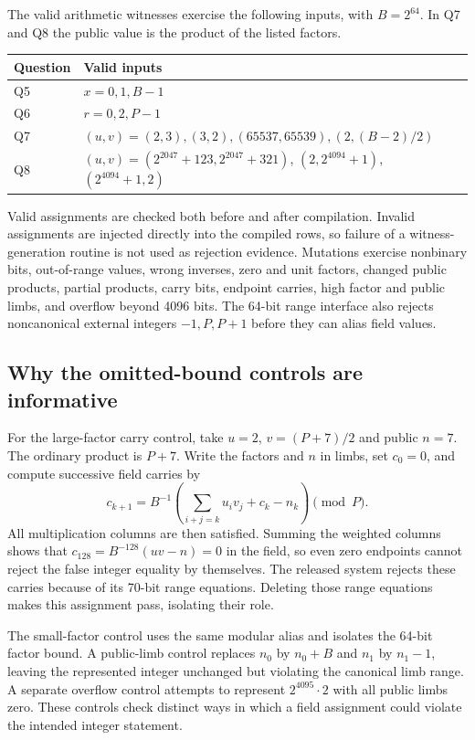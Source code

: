 \documentclass[11pt,a4paper]{article}
\begin{document}
The valid arithmetic witnesses exercise the following inputs, with
$B=2^{64}$. In Q7 and Q8 the public value is the product of the listed factors.
\begin{center}
\begin{tabularx}{\linewidth}{lX}\toprule
Question & Valid inputs\\\midrule
Q5 & $x=0,1,B-1$\\
Q6 & $r=0,2,P-1$\\
Q7 & $(u,v)=(2,3),(3,2),(65537,65539),(2,(B-2)/2)$\\
Q8 & $(u,v)=(2^{2047}+123,2^{2047}+321)$,
$(2,2^{4094}+1)$, $(2^{4094}+1,2)$\\\bottomrule
\end{tabularx}
\end{center} 
Valid assignments are checked both before and after compilation. Invalid
assignments are injected directly into the compiled rows, so failure of a
witness-generation routine is not used as rejection evidence. Mutations
exercise nonbinary bits, out-of-range values, wrong inverses, zero and unit
factors, changed public products, partial products, carry bits, endpoint
carries, high factor and public limbs, and overflow beyond 4096 bits.
The 64-bit range interface also rejects noncanonical external integers
$-1,P,P+1$ before they can alias field values.

\subsection{Why the omitted-bound controls are informative}
For the large-factor carry control, take $u=2$, $v=(P+7)/2$ and public
$n=7$. The ordinary product is $P+7$. Write the factors and $n$ in limbs,
set $c_0=0$, and compute successive field carries by
\[
c_{k+1}=B^{-1}\left(\sum_{i+j=k}u_iv_j+c_k-n_k\right)\pmod P.
\]
All multiplication columns are then satisfied. Summing the weighted columns
shows that $c_{128}=B^{-128}(uv-n)=0$ in the field, so even zero endpoints
cannot reject the false integer equality by themselves. The released system
rejects these carries because of its 70-bit range equations. Deleting those
range equations makes this assignment pass, isolating their role.

The small-factor control uses the same modular alias and isolates the
64-bit factor bound. A public-limb control replaces $n_0$ by $n_0+B$ and
$n_1$ by $n_1-1$, leaving the represented integer unchanged but violating
the canonical limb range. A separate overflow control attempts to represent
$2^{4095}\cdot2$ with all public limbs zero. These controls check distinct
ways in which a field assignment could violate the intended integer statement.
\end{document}
